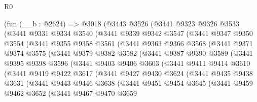 \begin{lexlean}{R0}
\begin{coremodule}
    (fun (__b : @2624) =>
    @3018
      (@3443
        @3526
        (@3441
          @9323
          @9326
          @3533
          (@3441
            @9331
            @9334
            @3540
            (@3441
              @9339
              @9342
              @3547
              (@3441
                @9347
                @9350
                @3554
                (@3441
                  @9355
                  @9358
                  @3561
                  (@3441
                    @9363
                    @9366
                    @3568
                    (@3441
                      @9371
                      @9374
                      @3575
                      (@3441
                        @9379
                        @9382
                        @3582
                        (@3441
                          @9387
                          @9390
                          @3589
                          (@3441
                            @9395
                            @9398
                            @3596
                            (@3441
                              @9403
                              @9406
                              @3603
                              (@3441
                                @9411
                                @9414
                                @3610
                                (@3441
                                  @9419
                                  @9422
                                  @3617
                                  (@3441
                                    @9427
                                    @9430
                                    @3624
                                    (@3441
                                      @9435
                                      @9438
                                      @3631
                                      (@3441
                                        @9443
                                        @9446
                                        @3638
                                        (@3441
                                          @9451
                                          @9454
                                          @3645
                                          (@3441
                                            @9459
                                            @9462
                                            @3652
                                            (@3441
                                              @9467
                                              @9470
                                              @3659

\end{coremodule}
\end{lexlean}
